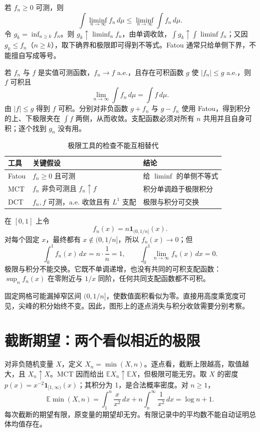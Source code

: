 
若 $f_n\geq0$ 可测，则
\[
 \int\liminf_{n\to\infty}f_n\,d\mu
 \leq\liminf_{n\to\infty}\int f_n\,d\mu.
\]
令 $g_k=\inf_{n\geq k}f_n$。则 $g_k\uparrow\liminf_nf_n$，由单调收敛，$\int g_k\uparrow\int\liminf f_n$；又因 $g_k\leq f_n$（$n\geq k$），取下确界和极限即可得到不等式。Fatou 通常只给单侧下界，不能擅自写成等号。


若 $f_n$ 与 $f$ 是实值可测函数，$f_n\to f$ a.e.，且存在可积函数 $g$ 使 $|f_n|\leq g$ a.e.，则 $f$ 可积且
\[
 \lim_{n\to\infty}\int f_n\,d\mu=\int f\,d\mu.
\]
由 $|f|\leq g$ 得到 $f$ 可积。分别对非负函数 $g+f_n$ 与 $g-f_n$ 使用 Fatou，得到积分的上、下极限夹在 $\int f$ 两侧，从而收敛。支配函数必须对所有 $n$ 共用并且自身可积；逐个找到 $g_n$ 没有用。

\begin{table}[htbp]
\centering
\small
\begin{tabular}{lll}
\toprule
工具 & 关键假设 & 结论\\
\midrule
Fatou & $f_n\geq0$ 且可测 & 给 $\liminf$ 的单侧不等式\\
MCT & $f_n$ 非负可测且 $f_n\uparrow f$ & 积分单调趋于极限积分\\
DCT & $f_n,f$ 可测，a.e. 收敛且有 $L^1$ 支配 & 极限与积分可交换\\
\bottomrule
\end{tabular}
\caption{极限工具的检查不能互相替代}
\end{table}


在 $[0,1]$ 上令
\[
 f_n(x)=n\mathbf1_{(0,1/n]}(x).
\]
对每个固定 $x$，最终都有 $x\notin(0,1/n]$，所以 $f_n(x)\to0$；但
\[
 \int_0^1f_n(x)\,dx=n\cdot\frac1n=1,
 \qquad
 \int_0^1\lim_{n\to\infty}f_n(x)\,dx=0.
\]
极限与积分不能交换。它既不单调递增，也没有共同的可积支配函数：$\sup_nf_n(x)$ 在零附近与 $1/x$ 同阶，任何共同支配函数都不可积。

固定网格可能漏掉窄区间 $(0,1/n]$，使数值面积看似为零。直接用高度乘宽度可见，尖峰的积分始终不变。因此，图形上的逐点消失与积分收敛需要分别考察。

\section{截断期望：两个看似相近的极限}
对非负随机变量 $X$，定义 $X_n=\min(X,n)$。逐点看，截断上限越高，取值越大，且 $X_n\uparrow X$。MCT 因而给出 $\mathbb E X_n\uparrow\mathbb E X$，但极限可能无穷。取 $X$ 的密度 $p(x)=x^{-2}\mathbf1_{[1,\infty)}(x)$；其积分为 1，是合法概率密度。对 $n\geq1$，
\[
 \mathbb E\min(X,n)=\int_1^n\frac{x}{x^2}\,dx
 +n\int_n^\infty\frac1{x^2}\,dx=\log n+1.
\]
每次截断的期望有限，原变量的期望却无穷。有限记录中的平均数不能自动证明总体均值存在。

